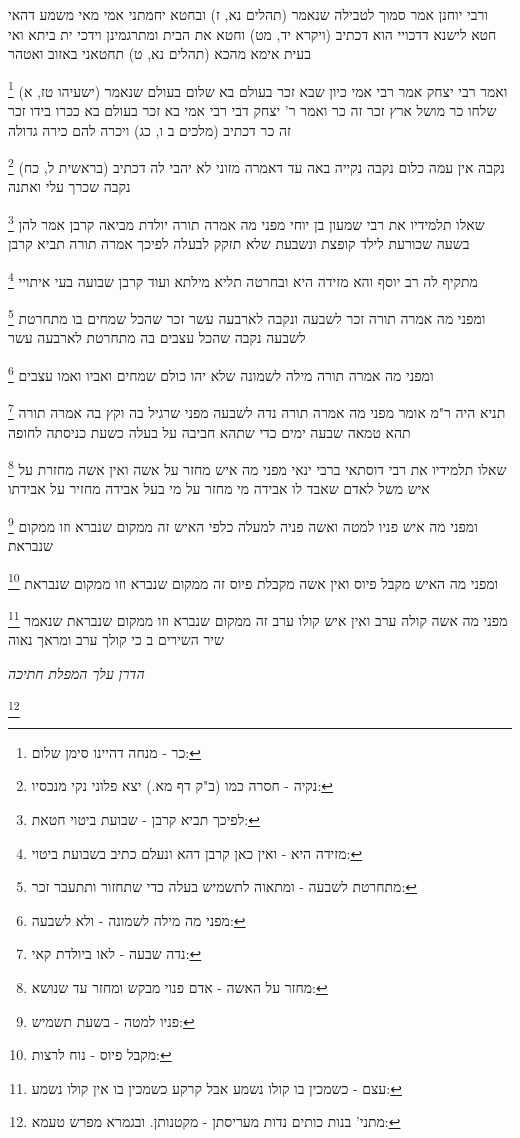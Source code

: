 \documentclass[12pt, openany]{book}
\newcommand{\footnotecomment}[1]{
	\renewcommand\thefootnote{}
	\footnote{#1}}
\newcommand{\commenta}[1]{\footnotecomment{#1}}
\begin{document}
{{ורבי יוחנן אמר סמוך לטבילה שנאמר (תהלים נא, ז) ובחטא יחמתני אמי 
מאי משמע דהאי חטא לישנא דדכויי הוא דכתיב (ויקרא יד, מט) וחטא את הבית ומתרגמינן וידכי ית ביתא ואי בעית אימא מהכא (תהלים נא, ט) תחטאני באזוב ואטהר 
\commenta{כר - מנחה דהיינו סימן שלום:}
ואמר רבי יצחק אמר רבי אמי כיון שבא זכר בעולם בא שלום בעולם שנאמר (ישעיהו טז, א) שלחו כר מושל ארץ זכר זה כר 
ואמר ר' יצחק דבי רבי אמי בא זכר בעולם בא ככרו בידו זכר זה כר דכתיב (מלכים ב ו, כג) ויכרה להם כירה גדולה 
\commenta{נקיה - חסרה כמו (ב"ק דף מא.) יצא פלוני נקי מנכסיו:}
נקבה אין עמה כלום נקבה נקייה באה עד דאמרה מזוני לא יהבי לה דכתיב (בראשית ל, כח) נקבה שכרך עלי ואתנה 
\commenta{לפיכך תביא קרבן - שבועת ביטוי חטאת:}
שאלו תלמידיו את רבי שמעון בן יוחי מפני מה אמרה תורה יולדת מביאה קרבן אמר להן בשעה שכורעת לילד קופצת ונשבעת שלא תזקק לבעלה לפיכך אמרה תורה תביא קרבן 
\commenta{מזידה היא - ואין כאן קרבן דהא ונעלם כתיב בשבועת ביטוי:}
מתקיף לה רב יוסף והא מזידה היא ובחרטה תליא מילתא ועוד קרבן שבועה בעי איתויי 
\commenta{מתחרטת לשבעה - ומתאוה לתשמיש בעלה כדי שתחזור ותתעבר זכר:}
ומפני מה אמרה תורה זכר לשבעה ונקבה לארבעה עשר זכר שהכל שמחים בו מתחרטת לשבעה נקבה שהכל עצבים בה מתחרטת לארבעה עשר 
\commenta{מפני מה מילה לשמונה - ולא לשבעה:}
ומפני מה אמרה תורה מילה לשמונה שלא יהו כולם שמחים ואביו ואמו עצבים 
\commenta{נדה שבעה - לאו ביולדת קאי:}
תניא היה ר"מ אומר מפני מה אמרה תורה נדה לשבעה מפני שרגיל בה וקץ בה אמרה תורה תהא טמאה שבעה ימים כדי שתהא חביבה על בעלה כשעת כניסתה לחופה 
\commenta{מחזר על האשה - אדם פנוי מבקש ומחזר עד שנושא:}
שאלו תלמידיו את רבי דוסתאי ברבי ינאי מפני מה איש מחזר על אשה ואין אשה מחזרת על איש משל לאדם שאבד לו אבידה מי מחזר על מי בעל אבידה מחזיר על אבידתו 
\commenta{פניו למטה - בשעת תשמיש:}
ומפני מה איש פניו למטה ואשה פניה למעלה כלפי האיש זה ממקום שנברא וזו ממקום שנבראת 
\commenta{מקבל פיוס - נוח לרצות:}
ומפני מה האיש מקבל פיוס ואין אשה מקבלת פיוס זה ממקום שנברא וזו ממקום שנבראת 
\commenta{עצם - כשמכין בו קולו נשמע אבל קרקע כשמכין בו אין קולו נשמע:}
מפני מה אשה קולה ערב ואין איש קולו ערב זה ממקום שנברא וזו ממקום שנבראת שנאמר {שיר השירים ב } כי קולך ערב ומראך נאוה
\par \par {\large\emph{הדרן עלך המפלת חתיכה}}\par \par 
\commenta{מתני' בנות כותים נדות מעריסתן - מקטנותן. ובגמרא מפרש טעמא:}

}}
\end{document}
